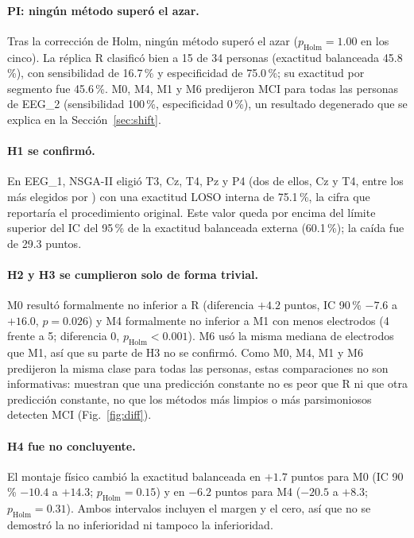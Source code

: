 \paragraph{PI: ningún método superó el azar.} Tras la corrección de Holm, ningún método superó el azar ($p_\text{Holm}=1.00$ en los cinco). La réplica R clasificó bien a 15 de 34 personas (exactitud balanceada 45.8\,\%), con sensibilidad de 16.7\,\% y especificidad de 75.0\,\%; su exactitud por segmento fue 45.6\,\%. M0, M4, M1 y M6 predijeron MCI para todas las personas de EEG\_2 (sensibilidad 100\,\%, especificidad 0\,\%), un resultado degenerado que se explica en la Sección~\ref{sec:shift}.

\paragraph{H1 se confirmó.} En EEG\_1, NSGA-II eligió T3, Cz, T4, Pz y P4 (dos de ellos, Cz y T4, entre los más elegidos por \citealp{aljalal2024}) con una exactitud LOSO interna de 75.1\,\%, la cifra que reportaría el procedimiento original. Este valor queda por encima del límite superior del IC del 95\,\% de la exactitud balanceada externa (60.1\,\%); la caída fue de 29.3 puntos.

\paragraph{H2 y H3 se cumplieron solo de forma trivial.} M0 resultó formalmente no inferior a R (diferencia $+4.2$ puntos, IC 90\,\% $-7.6$ a $+16.0$, $p=0.026$) y M4 formalmente no inferior a M1 con menos electrodos (4 frente a 5; diferencia 0, $p_\text{Holm}<0.001$). M6 usó la misma mediana de electrodos que M1, así que su parte de H3 no se confirmó. Como M0, M4, M1 y M6 predijeron la misma clase para todas las personas, estas comparaciones no son informativas: muestran que una predicción constante no es peor que R ni que otra predicción constante, no que los métodos más limpios o más parsimoniosos detecten MCI (Fig.~\ref{fig:diff}).

\paragraph{H4 fue no concluyente.} El montaje físico cambió la exactitud balanceada en $+1.7$ puntos para M0 (IC 90\,\% $-10.4$ a $+14.3$; $p_\text{Holm}=0.15$) y en $-6.2$ puntos para M4 ($-20.5$ a $+8.3$; $p_\text{Holm}=0.31$). Ambos intervalos incluyen el margen y el cero, así que no se demostró la no inferioridad ni tampoco la inferioridad.


